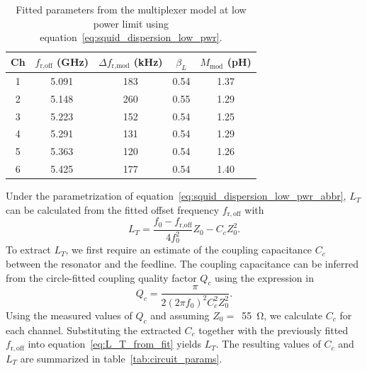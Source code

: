 \documentclass[10pt]{iopart}
\begin{document}
\begin{table}[htb]
    \centering
    \begin{tabular}{c c c c c}
    \hline
         \small{Ch} & \small{$f_{\text{r,off}}$ (GHz)} & \small{$\Delta f_{\text{r,mod}}$ (kHz)} & \small{$\beta_L$} & \small{$M_{\text{mod}}$ (pH)}\\
    \hline
    1 & 5.091 & 183 & 0.54 & 1.37 \\
    2 & 5.148 & 260 & 0.55 & 1.29 \\
    3 & 5.223 & 152 & 0.54 & 1.25 \\
    4 & 5.291 & 131 & 0.54 & 1.29 \\
    5 & 5.363 & 120 & 0.54 & 1.26 \\
    6 & 5.425 & 177 & 0.54 & 1.40 \\
    \hline
    \end{tabular}
    \caption{Fitted parameters from the multiplexer model at low power limit using equation~\eqref{eq:squid_dispersion_low_pwr}.}
    \label{tab:mates_fit_params}
\end{table}

Under the parametrization of equation~\eqref{eq:squid_dispersion_low_pwr_abbr}, $L_T$ can be calculated from the fitted offset frequency $f_{\mathrm{r,off}}$ with
\begin{equation} \label{eq:L_T_from_fit}
    L_T = \frac{f_0-f_{\text{r,off}}}{4f_0^2}Z_0 - C_c Z_0^2.
\end{equation}
To extract $L_T$, we first require an estimate of the coupling capacitance $C_c$ between the resonator and the feedline. The coupling capacitance can be inferred from the circle-fitted coupling quality factor $Q_c$ using the expression in~\cite{mates_microwave_2011}
\begin{equation}
    Q_c = \frac{\pi}{2 (2 \pi f_0)^2 C_c^2 Z_0^2}.
\end{equation}
Using the measured values of $Q_c$ and assuming \mbox{$Z_0 =$ \qty{55}{\ohm}}, we calculate $C_c$ for each channel. Substituting the extracted $C_c$ together with the previously fitted $f_{\mathrm{r,off}}$ into equation~\eqref{eq:L_T_from_fit} yields $L_T$. The resulting values of $C_c$ and $L_T$ are summarized in table~\ref{tab:circuit_params}.
\end{document}
